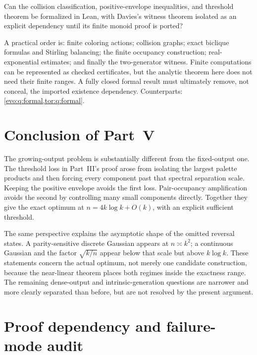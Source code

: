 \documentclass[11pt,a4paper]{article}
\numberwithin{equation}{section}
\theoremstyle{definition}
\theoremstyle{remark}
\begin{document}
\begin{question}\label{nl:q:formal}
Can the collision classification, positive-envelope inequalities, and
threshold theorem be formalized in Lean, with Davies's witness theorem
isolated as an explicit dependency until its finite monoid proof is ported?
\end{question}
A practical order is: finite coloring actions; collision graphs; exact
biclique formulas and Stirling balancing; the finite occupancy construction;
real-exponential estimates; and finally the two-generator witness.
Finite computations can be represented as checked certificates, but the
analytic theorem here does not need their finite ranges. A fully closed
formal result must ultimately remove, not conceal, the imported existence
dependency.
Counterparts: \cref{evo:q:formal,tor:q:formal}.

\section{Conclusion of Part~V}\label{nl:sec:conclusion}

The growing-output problem is substantially different from the fixed-output
one. The threshold loss in Part~III's proof arose from
isolating the largest palette products and then forcing every component
past that spectral separation scale. Keeping the positive envelope avoids
the first loss. Pair-occupancy amplification avoids the second by controlling
many small components directly. Together they give the exact optimum at
$n=4k\log k+O(k)$, with an explicit sufficient threshold.

The same perspective explains the asymptotic shape of the omitted reversal
states. A parity-sensitive discrete Gaussian appears at $n\asymp k^2$;
a continuous Gaussian and the factor $\sqrt{k/n}$ appear below that scale
but above $k\log k$. These statements concern the actual optimum, not
merely one candidate construction, because the near-linear theorem places
both regimes inside the exactness range. The remaining dense-output and
intrinsic-generation questions are narrower and more clearly separated
than before, but are not resolved by the present argument.

\section{Proof dependency and failure-mode audit}\label{nl:app:audit}
\end{document}
